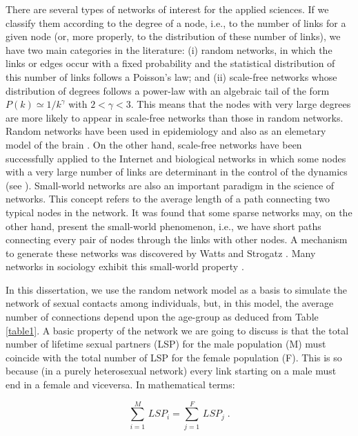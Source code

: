 There are several types of networks of interest for the applied sciences. If we classify them according to the degree of a node, i.e., to the number of links for a given node (or, more properly, to the distribution of these number of links), we have two main categories in the literature: (i) random networks, in which the links or edges occur with a fixed probability and the statistical distribution of this number of links follows a Poisson's law; and (ii) scale-free networks whose distribution of degrees follows a power-law with an
algebraic tail of the form $P(k) \simeq 1/k^\gamma$ with $2 < \gamma < 3$. This means that the nodes with very large degrees are more likely to appear in scale-free networks than those in random networks. Random networks have been used in epidemiology \cite{acedo2011using} and also as an elemetary model of the brain \cite{acedo2013brain}. On the other hand, scale-free networks have been successfully applied to the Internet and biological networks in which some nodes with a very large number of links are determinant in the control of the dynamics (see \cite{dorogovtsev2013evolution}). Small-world networks are also an important paradigm in the science of networks. This concept refers to the average length of a path connecting two typical nodes in the network. It was found that some sparse networks may, on the other hand, present the small-world phenomenon, i.e., we have short paths connecting every pair of nodes through the links with other nodes. A mechanism to generate these networks was discovered by Watts and Strogatz \cite{watts1998collective}. Many networks in sociology exhibit this small-world property \cite{christakis2007spread,liljeros2001web,bearman2004chains}.

In this dissertation, we use the random network model as a basis to simulate the network of sexual contacts among individuals, but, in this model, the average number of connections depend upon the age-group as deduced from Table \ref{table1}. A basic property of the network we are going to discuss is that the total number of lifetime sexual partners (LSP) for the male population (M) must coincide with the total number of LSP for the female population (F). This is so because (in a purely heterosexual network) every link starting on a male must end in a female and viceversa. In mathematical terms:

\begin{equation}
\label{nodeseq}
\displaystyle\sum_{i=1}^M\, LSP_i=\displaystyle\sum_{j=1}^F\, LSP_j\; .
\end{equation}

